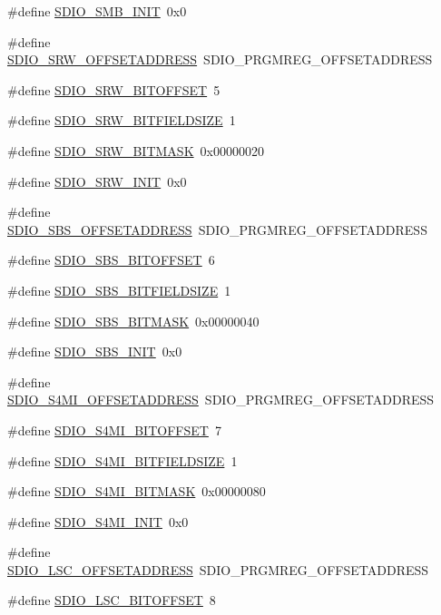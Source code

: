 \begin{DoxyCompactItemize}
\item 
\#define \hyperlink{a00571_a026804036d24ec9a884c866dd2cee05c}{SDIO\_\-SMB\_\-INIT}~0x0
\item 
\#define \hyperlink{a00571_a4a6e4534ff267ad0a80fad558c58a965}{SDIO\_\-SRW\_\-OFFSETADDRESS}~SDIO\_\-PRGMREG\_\-OFFSETADDRESS
\item 
\#define \hyperlink{a00571_a81b2c5ce7c848f2d38a0ee0c2b8301f8}{SDIO\_\-SRW\_\-BITOFFSET}~5
\item 
\#define \hyperlink{a00571_a19f0607259df8d03d0d9f1efcf63babb}{SDIO\_\-SRW\_\-BITFIELDSIZE}~1
\item 
\#define \hyperlink{a00571_a6a834febf301d6ad6ad4380a7ce86ef6}{SDIO\_\-SRW\_\-BITMASK}~0x00000020
\item 
\#define \hyperlink{a00571_a8bb710f02e13a9c97e452ac3149b7b9c}{SDIO\_\-SRW\_\-INIT}~0x0
\item 
\#define \hyperlink{a00571_ae9485a368bdfdd8b921feffe1c83405e}{SDIO\_\-SBS\_\-OFFSETADDRESS}~SDIO\_\-PRGMREG\_\-OFFSETADDRESS
\item 
\#define \hyperlink{a00571_ab46ed01d39532bbb6207c81ffbd702cd}{SDIO\_\-SBS\_\-BITOFFSET}~6
\item 
\#define \hyperlink{a00571_ae14a40157cc5ba05e4569db3d2052310}{SDIO\_\-SBS\_\-BITFIELDSIZE}~1
\item 
\#define \hyperlink{a00571_a5b70496c1b1393ecc443ddcccc86e6cd}{SDIO\_\-SBS\_\-BITMASK}~0x00000040
\item 
\#define \hyperlink{a00571_a932e3b494f835e01ac00b663afe35dfe}{SDIO\_\-SBS\_\-INIT}~0x0
\item 
\#define \hyperlink{a00571_af7dc69d26417078dbe30b6ca0c4bf6ea}{SDIO\_\-S4MI\_\-OFFSETADDRESS}~SDIO\_\-PRGMREG\_\-OFFSETADDRESS
\item 
\#define \hyperlink{a00571_a519444cd44786371cec7d9ea225377ec}{SDIO\_\-S4MI\_\-BITOFFSET}~7
\item 
\#define \hyperlink{a00571_adc218673caa0376c82da57dfec868705}{SDIO\_\-S4MI\_\-BITFIELDSIZE}~1
\item 
\#define \hyperlink{a00571_a8fa4e455012dd3fd1eb37433141e6fb8}{SDIO\_\-S4MI\_\-BITMASK}~0x00000080
\item 
\#define \hyperlink{a00571_aaf3e0ba9d1a05e18bb227d263e9e1a58}{SDIO\_\-S4MI\_\-INIT}~0x0
\item 
\#define \hyperlink{a00571_a87eddab043aad5647654d88a7fb1849e}{SDIO\_\-LSC\_\-OFFSETADDRESS}~SDIO\_\-PRGMREG\_\-OFFSETADDRESS
\item 
\#define \hyperlink{a00571_a98034b9d44e6847c1c6863558884a9e5}{SDIO\_\-LSC\_\-BITOFFSET}~8

\end{DoxyCompactItemize}
